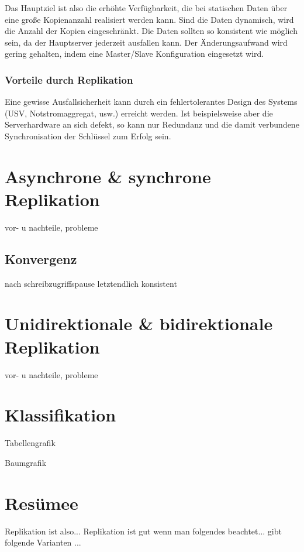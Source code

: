 Das Hauptziel ist also die erhöhte Verfügbarkeit, die bei statischen Daten über eine große Kopienanzahl realisiert werden kann. Sind die Daten dynamisch, wird die Anzahl der Kopien eingeschränkt. Die Daten sollten so konsistent wie möglich sein, da der Hauptserver jederzeit ausfallen kann. Der Änderungsaufwand wird gering gehalten, indem eine Master/Slave Konfiguration eingesetzt wird.

\subsubsection{Vorteile durch Replikation}

Eine gewisse Ausfallsicherheit kann durch ein fehlertolerantes Design des Systems (USV, Notstromaggregat, usw.) erreicht werden. Ist beispielsweise aber die Serverhardware an sich defekt, so kann nur Redundanz und die damit verbundene Synchronisation der Schlüssel zum Erfolg sein.

\section{Asynchrone \& synchrone Replikation}

vor- u nachteile, probleme

\subsection{Konvergenz}

nach schreibzugriffspause letztendlich konsistent

\section{Unidirektionale \& bidirektionale Replikation}

vor- u nachteile, probleme

\section{Klassifikation}

Tabellengrafik

Baumgrafik

\section{Resümee}
Replikation ist also...
Replikation ist gut wenn man folgendes beachtet...
gibt folgende Varianten ...